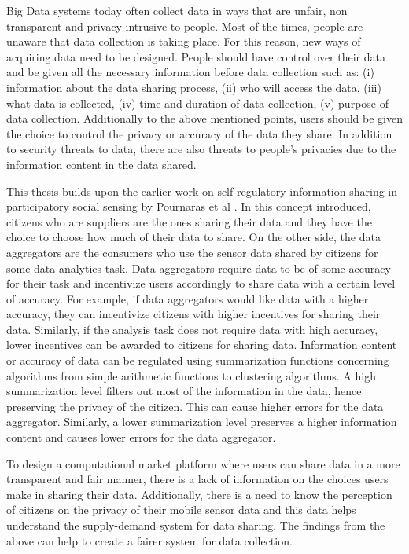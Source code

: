 Big Data systems today often collect data in ways that are unfair, non transparent and privacy intrusive to people. Most of the times, people are unaware that data collection is taking place. For this reason, new ways of acquiring data need to be designed. People should have control over their data and be given all the necessary information before data collection such as: (i) information about the data sharing process, (ii) who will access the data, (iii) what data is collected, (iv) time and duration of data collection, (v) purpose of data collection. Additionally to the above mentioned points, users should be given the choice to control the privacy or accuracy of the data they share. In addition to security threats to data, there are also threats to people's privacies due to the information content in the data shared. 

This thesis builds upon the earlier work on self-regulatory information sharing in participatory social sensing by Pournaras et al \cite{pournaras2016self}. In this concept introduced, citizens who are suppliers are the ones sharing their data and they have the choice to choose how much of their data to share. On the other side, the data aggregators are the consumers who use the sensor data shared by citizens for some data analytics task. Data aggregators require data to be of some accuracy for their task and incentivize users accordingly  to share data with a certain level of accuracy. For example, if data aggregators would like data with a higher accuracy, they can incentivize citizens with higher incentives for sharing their data. Similarly, if the analysis task does not require data with high accuracy, lower incentives can be awarded to citizens for sharing data. Information content or accuracy of data can be regulated using summarization functions concerning algorithms from simple arithmetic functions to clustering algorithms. A high summarization level filters out most of the information in the data, hence preserving the privacy of the citizen. This can cause higher errors for the data aggregator. Similarly, a lower summarization level preserves a higher information content and causes lower errors for the data aggregator.

To design a computational market platform where users can share data in a more transparent and fair manner, there is a lack of information on the choices users make in sharing their data. Additionally, there is a need to know the perception of citizens on the privacy of their mobile sensor data and this data helps understand the supply-demand system for data sharing. The findings from the above can help to create a fairer system for data collection. 

